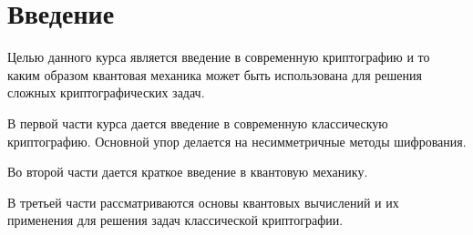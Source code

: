 \chapter*{Введение}
Целью данного курса является введение в современную криптографию и то
каким образом квантовая механика может быть использована для решения
сложных криптографических задач.

В первой части курса дается введение в современную классическую
криптографию. Основной упор делается на несимметричные методы
шифрования.

Во второй части дается краткое введение в квантовую механику.

В третьей части рассматриваются основы квантовых вычислений и их
применения для решения задач классической криптографии.
